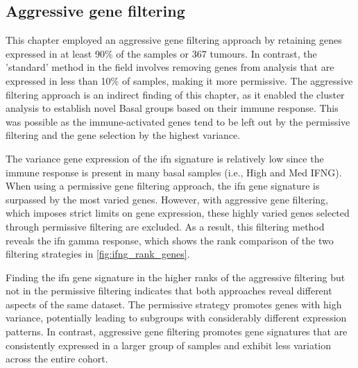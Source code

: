 \subsection*{Aggressive gene filtering} \label{s:cs:agg_filt}


This chapter employed an aggressive gene filtering approach by retaining genes expressed in at least 90\% of the samples or 367 tumours. In contrast, the 'standard' method in the field involves removing genes from analysis that are expressed in less than 10\% of samples, making it more permissive. The aggressive filtering approach is an indirect finding of this chapter, as it enabled the cluster analysis to establish novel Basal groups based on their immune response. This was possible as the immune-activated genes tend to be left out by the permissive filtering and the gene selection by the highest variance. 

The variance gene expression of the \acrshort{ifn} signature is relatively low since the immune response is present in many basal samples (i.e., High and Med IFNG). When using a permissive gene filtering approach, the \acrshort{ifn} gene signature is surpassed by the most varied genes. However, with aggressive gene filtering, which imposes strict limits on gene expression, these highly varied genes selected through permissive filtering are excluded. As a result, this filtering method reveals the \acrlong{ifn} gamma response, which shows the rank comparison of the two filtering strategies in \cref{fig:ifng_rank_genes}.

Finding the \acrlong{ifn} gene signature in the higher ranks of the aggressive filtering but not in the permissive filtering indicates that both approaches reveal different aspects of the same dataset. The permissive strategy promotes genes with high variance, potentially leading to subgroups with considerably different expression patterns. In contrast, aggressive gene filtering promotes gene signatures that are consistently expressed in a larger group of samples and exhibit less variation across the entire cohort.


